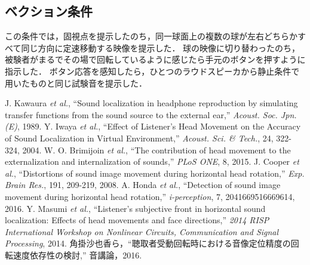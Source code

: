 \documentclass[12pt,a4j]{jsarticle}
\renewcommand{\ }{\hspace{1zw}}
\begin{document}
\subsection{ベクション条件}
この条件では，固視点を提示したのち，同一球面上の複数の球が左右どちらかすべて同じ方向に定速移動する映像を提示した．
球の映像に切り替わったのち，被験者がまるでその場で回転しているように感じたら手元のボタンを押すように指示した．
ボタン応答を感知したら，ひとつのラウドスピーカから静止条件で用いたものと同じ試験音を提示した．

\begin{thebibliography}{1}
     J. Kawaura {\it et al.}, ``Sound localization in headphone reproduction by simulating transfer functions from the sound source to the external ear,'' {\it Acoust. Soc. Jpn.(E)}, 1989.
     Y. Iwaya {\it et al.}, ``Effect of Listener's Head Movement on the Accuracy of Sound Localization in Virtual Environment,'' {\it Acoust. Sci. \& Tech.}, 24, 322-324, 2004.
     W. O. Brimijoin {\it et al.}, ``The contribution of head movement to the externalization and internalization of sounds,'' {\it PLoS ONE}, 8, 2015.
     J. Cooper {\it et al.}, ``Distortions of sound image movement during horizontal head rotation,'' {\it Exp. Brain Res.}, 191, 209-219, 2008.
     A. Honda {\it et al.}, ``Detection of sound image movement during horizontal head rotation,'' {\it i-perception}, 7, 2041669516669614, 2016.
     Y. Masumi {\it et al.}, ``Listener's subjective front in horizontal sound localization: Effects of head movements and face directions,'' {\it 2014 RISP International Workshop on Nonlinear Circuits, Communication and Signal Processing}, 2014.
     角掛沙也香ら，``聴取者受動回転時における音像定位精度の回転速度依存性の検討,'' 音講論，2016.
\end{thebibliography}
\end{document}
